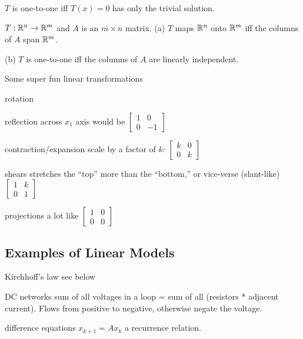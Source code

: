 \begin{card}
    \begin{theorem}
        $T$ is one-to-one iff $T(x) = 0$ has only the trivial solution.
    \end{theorem}

    \begin{theorem}
        $T: \mathbb{R}^n \to \mathbb{R}^m$ and $A$ is an $m \times n$ matrix.
        (a) $T$ maps $\mathbb{R}^n$ onto $\mathbb{R}^m$ iff the columns of $A$ span $\mathbb{R}^m$.

        (b) $T$ is one-to-one iff the columns of $A$ are linearly independent.
    \end{theorem}

    Some super fun linear transformations
    \begin{compactdesc}
    \item[rotation]
    \item[reflection]
    across $x_1$ axis would be $\begin{bmatrix}1 & 0 \\ 0 & -1\end{bmatrix}$
    \item[contraction/expansion] scale by a factor of $k$:
        $\begin{bmatrix} k & 0 \\ 0 & k \end{bmatrix}$
    \item[shears]
    stretches the ``top'' more than the ``bottom,'' or vice-verse
    (slant-like)
        $\begin{bmatrix} 1 & k \\ 0 & 1 \end{bmatrix}$
    \item[projections]
        a lot like $\begin{bmatrix} 1 & 0 \\ 0 & 0 \end{bmatrix}$
    \end{compactdesc}
\end{card}



\begin{card}
    \subsection{Examples of Linear Models}

    \begin{compactdesc}
    \item[Kirchhoff's law] see below
    \item[DC networks] sum of all voltages in a loop = sum of all (resistors
        * adjacent current). Flows from positive to negative, otherwise
        negate the voltage.
    \item[difference equations] $x_{k+1} = Ax_k$ a recurrence relation.
    \end{compactdesc}
\end{card}



